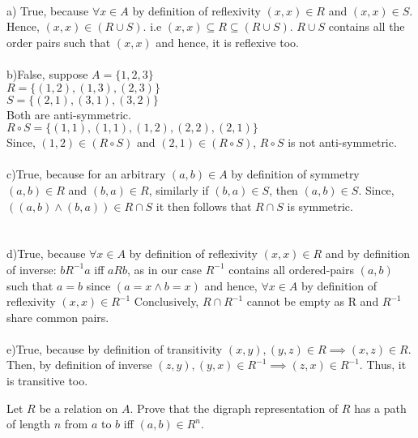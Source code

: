 \documentclass[addpoints]{exam}
\begin{document}
\begin{questions}
  \begin{solution}
    \\a) True, because $\forall x \in A$ by definition of reflexivity $(x, x) \in R$ and $(x, x) \in S$. Hence, $(x, x) \in (R \cup S)$. i.e $(x, x) \subseteq R \subseteq (R \cup S)$. $R \cup S$ contains all the order pairs such that $(x, x)$ and hence, it is reflexive too.
    \\
    \\b)False, suppose $A = \{1, 2, 3\}$
    \\$R = \{(1, 2), (1, 3), (2, 3)\}$ 
    \\$S = \{(2, 1), (3, 1), (3, 2)\}$
    \\Both are anti-symmetric.
    \\$R \circ S = \{(1, 1), (1, 1), (1, 2), (2, 2), (2, 1)\}$
    \\Since, $(1, 2) \in (R \circ S)$ and $(2, 1) \in (R \circ S)$, $R \circ S$ is not anti-symmetric.
    \\
    \\c)True, because for an arbitrary $(a, b) \in A$ by definition of symmetry $(a, b) \in R$ and $(b, a) \in R$, similarly if $(b, a) \in S$, then $(a,b) \in S$. Since, $((a, b) \wedge (b, a)) \in R \cap S$ it then follows that $R \cap S$ is symmetric.
    \\
    \\
    \\d)True, because $\forall x \in A$ by definition of reflexivity $(x, x) \in R$ and by definition of inverse: $b R^{-1} a$ iff $a R b$, as in our case $R^{-1}$ contains all ordered-pairs $(a, b)$ such that $a = b$ since $(a = x \wedge b = x)$ and hence,  $\forall x \in A$ by definition of reflexivity $(x, x) \in R^{-1}$ Conclusively, $R \cap R^{-1}$ cannot be empty as R and $R^{-1}$ share common pairs.
    \\
    \\e)True, because by definition of transitivity $(x,y),(y,z) \in R \implies (x, z) \in R$. Then, by definition of inverse $(z,y),(y,x) \in R^{-1} \implies (z, x) \in R^{-1}$. Thus, it is transitive too.
  \end{solution}
  
\question Let $R$ be a relation on $A$. Prove that the digraph representation of $R$ has a path of length $n$ from $a$ to $b$ iff $(a, b) \in R^n$.
 

\end{questions}
\end{document}
